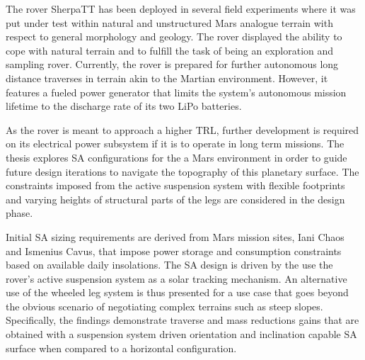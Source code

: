The rover SherpaTT has been deployed in several field experiments where it was put under test within natural and unstructured Mars analogue terrain with respect to general morphology and geology. The rover displayed the ability to cope with natural terrain and to fulfill the task of being an exploration and sampling rover. Currently, the rover is prepared for further autonomous long distance traverses in terrain akin to the Martian environment. However, it features a fueled power generator that limits the system's autonomous mission lifetime to the discharge rate of its two LiPo batteries.

As the rover is meant to approach a higher \ac{TRL}, further development is required on its electrical power subsystem if it is to operate in long term missions. The thesis explores \ac{SA} configurations for the a Mars environment in order to guide future design iterations to navigate the topography of this planetary surface. The constraints imposed from the active suspension system with flexible footprints and varying heights of structural parts of the legs are considered in the design phase.

Initial \ac{SA} sizing requirements are derived from Mars mission sites, Iani Chaos and Ismenius Cavus, that impose power storage and consumption constraints based on available daily insolations. The \ac{SA} design is driven by the use the rover's active suspension system as a solar tracking mechanism. An alternative use of the wheeled leg system is thus presented for a use case that goes beyond the obvious scenario of negotiating complex terrains such as steep slopes. Specifically, the findings demonstrate traverse and mass reductions gains that are obtained with a suspension system driven orientation and inclination capable \ac{SA} surface when compared to a horizontal configuration.






